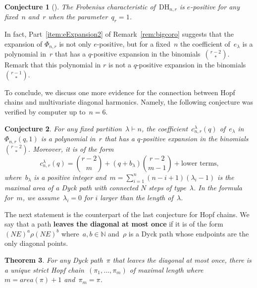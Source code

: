 \documentclass{amsart}
\newtheorem{theorem}{Theorem}[section]
\newtheorem{conjecture}[theorem]{Conjecture}
\theoremstyle{definition}
\newcommand{\N}{\mathbb{N}} %
\newcommand{\defn}[1]{\textbf{\textsf{\color{PineGreen} #1}}} %
\newcommand{\DiagHarm}[2]{\mathrm{DH}_{#1,#2}} %
\begin{document}
\begin{conjecture}[\cite{Bergeron-ePositivityConjecture}]
The Frobenius characteristic of~$\DiagHarm{n}{r}$ is $e$-positive for any fixed~$n$ and~$r$ when the parameter~$q_r=1$.
\end{conjecture} 

In fact, Part~\eqref{item:eExpansion2} of Remark~\ref{rem:bigcoro} suggests that the expansion of $\Phi_{n,r}$ is not only $e$-positive, but for a fixed~$n$ the coefficient of~$e_\lambda$ is a polynomial in~$r$ that has a $q$-positive expansion in the binomials~${r-2\choose *}$. Remark that this polynomial in $r$ is not a $q$-positive expansion in the binomials~${r-1 \choose *}$. 

To conclude, we discuss one more evidence for the connection between Hopf chains and multivariate diagonal harmonics. Namely, the following conjecture was verified by computer up to~$n = 6$.

\begin{conjecture}
\label{conj:structureTopCoeff}
For any fixed partition~$\lambda \vdash n$, the coefficient~$c_{n,r}^\lambda(q)$ of~$e_\lambda$ in~$\Phi_{n,r}(q,1)$ 
is a polynomial in~$r$ that has a $q$-positive expansion in the binomials~${r-2\choose *}$. Moreover, it is of the form
\[
c_{n,r}^\lambda(q) = \textstyle \binom{r-2}{m} + (q+b_\lambda) \textstyle \binom{r-2}{m-1} + \text{lower terms,}
\]
where~$b_\lambda$ is a positive integer and~$m = \sum_{i=1}^n (n-i+1)(\lambda_i-1)$ is the maximal area of a Dyck path with connected $N$ steps of type~$\lambda$. In the formula for~$m$, we assume~$\lambda_i = 0$ for $i$ larger than the length of~$\lambda$.
\end{conjecture}

The next statement is the counterpart of the last conjecture for Hopf chains.
We say that a path \defn{leaves the diagonal at most once} if it is of the form~$(NE)^a \rho (NE)^b$ where~$a,b \in \N$ and~$\rho$ is a Dyck path whose endpoints are the only diagonal points.

\begin{theorem}
\label{thm:maxchain}
For any Dyck path~$\pi$ that leaves the diagonal at most once, there is a unique strict Hopf chain~$(\pi_1,\ldots,\pi_m)$ of maximal length where $m = area(\pi)+1$ and~$\pi_m = \pi$.
\end{theorem}
 
\end{document}
